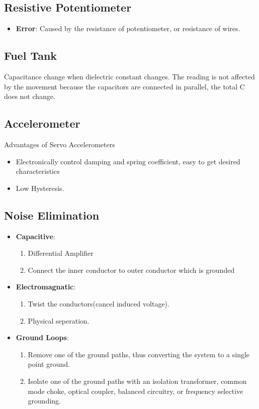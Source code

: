 \documentclass{article}
\begin{document}
  \subsection{Resistive Potentiometer}
  \begin{itemize}
  \item \textbf{Error}: Caused by the resistance of potentiometer, or resistance of wires.
  \end{itemize}
  
  \subsection{Fuel Tank}
  Capacitance change when dielectric constant changes. The reading is not affected by the movement because the capacitors are connected in parallel, the total C does not change.
  
  \subsection{Accelerometer}
  Advantages of Servo Accelerometers
  \begin{itemize}
  \item Electronically control damping and spring coefficient, easy to get desired characteristics
  \item Low Hysteresis.
  \end{itemize}
  
  \subsection{Noise Elimination}
  \begin{itemize}
  \item \textbf{Capacitive}: \begin{enumerate}
  \item Differential Amplifier
  \item Connect the inner conductor to outer conductor which is grounded
  \end{enumerate}
  
  \item \textbf{Electromagnatic}: \begin{enumerate}
  \item Twist the conductors(cancel induced voltage).
  \item Physical seperation.
  \end{enumerate}
  
  \item \textbf{Ground Loops}: \begin{enumerate}
  \item Remove one of the ground paths, thus converting the system to a single point ground.
  
  \item Isolate one of the ground paths with an isolation transformer, common mode choke, optical coupler, balanced circuitry, or frequency selective grounding.
  \end{enumerate}
  \end{itemize}
  
\end{document}
